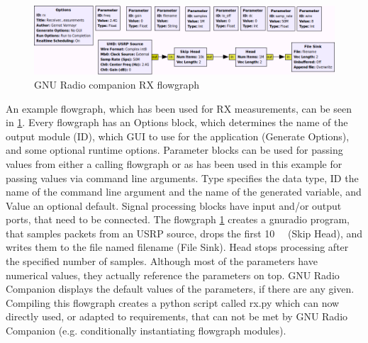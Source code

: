 \documentclass[12pt,a4paper,parskip=full]{scrartcl}
\begin{document}
\begin{figure}[htb]
    \centering
    \includegraphics[width=\textwidth]{grc}
    \caption{GNU Radio companion RX flowgraph}
    \label{fig:grc_rx}
\end{figure}
An example flowgraph, which has been used for RX measurements, can be seen in \cref{fig:grc_rx}.
Every flowgraph has an {\ttfamily Options} block, which determines the name of the output module ({\ttfamily ID}),
which GUI to use for the application ({\ttfamily Generate Options}), and some optional runtime options.
{\ttfamily Parameter} blocks can be used for passing values from either a calling flowgraph or as has
been used in this example for passing values via command line arguments. {\ttfamily Type} specifies the
data type, {\ttfamily ID} the name of the command line argument and the name of the generated variable,
and {\ttfamily Value} an optional default. Signal processing blocks have input and/or output ports, that
need to be connected. The flowgraph \cref{fig:grc_rx} creates a gnuradio program, that samples
packets from an USRP source, drops the first \SI{10}{\kilo\samples} ({\ttfamily Skip Head}), and writes
them to the file named {\ttfamily filename} ({\ttfamily File Sink}). {\ttfamily Head} stops processing after the
specified number of samples. Although most of the parameters have numerical values, they actually
reference the parameters on top. GNU Radio Companion displays the default values of the parameters,
if there are any given. Compiling this flowgraph creates a python script called {\ttfamily rx.py} which
can now directly used, or adapted to requirements, that can not be met by GNU Radio Companion (e.g.
conditionally instantiating flowgraph modules).
\end{document}
